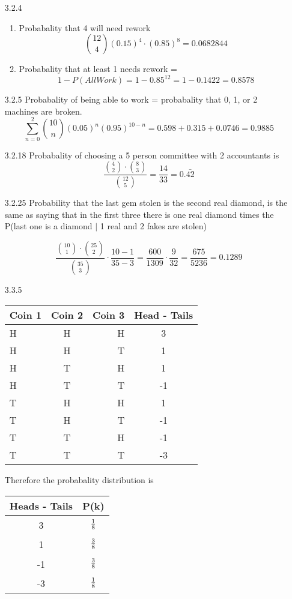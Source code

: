 \documentclass[11pt,fleqn]{article}
\begin{document}
\begin{enumerate}
\item[3.2.4] 
\begin{enumerate}
  \item
Probabality that 4 will need rework 
\[
{ 12 \choose 4 }(0.15)^4 \cdot (0.85)^{8} = 0.0682844
\]
\item
Probabality that at least 1 needs rework = 
\[
1-P(All Work) = 1- 0.85^{12} = 1 - 0.1422 = 0.8578
\]
\end{enumerate}
\item[3.2.5]
Probabality of being able to work = probabality that 0, 1, or 2 machines are
broken. 
\[
\sum_{n=0}^{2} {10 \choose n}(0.05)^n(0.95)^{10-n} = 0.598 + 0.315 + 0.0746 =
0.9885
\]
\item[3.2.18]
Probabality of choosing a 5 person committee with 2 accountants is 
\[
\frac{ {4 \choose 2} \cdot {8 \choose 3} } { {12 \choose 5} } = \frac{14}{33} =
0.\bar{42}
\]

\item[3.2.25]
Probability that the last gem stolen is the second real diamond, is the same as
saying that in the first three there is one real diamond times the P(last one
is a diamond $\mid$ 1 real and 2 fakes are stolen)

\[
\frac{ {10 \choose 1 } \cdot {25 \choose 2} } {{35 \choose 3}} \cdot
\frac{10-1}{35-3} = \frac{600}{1309} \cdot \frac{9}{32} = \frac{675}{5236} =
0.1289
\]
\item[3.3.5]
\begin{tabular}{l c r | c}
Coin 1 & Coin 2 & Coin 3 & Head - Tails \\
\hline
H & H & H & 3 \\
H & H & T & 1 \\
H & T & H & 1 \\
H & T & T & -1 \\
T & H & H & 1 \\
T & H & T & -1 \\
T & T & H & -1 \\
T & T & T & -3 \\
\hline
\end{tabular} 

Therefore the probabality distribution is 

\begin{tabular}{c c} 
Heads - Tails & P(k) \\
\hline
3 & $\tabfrac{1}{8}$ \\
1 & $\tabfrac{3}{8}$ \\
-1 & $\tabfrac{3}{8}$ \\ 
-3 & $\tabfrac{1}{8}$\\
\hline
\end{tabular}


\end{enumerate}
\end{document}
